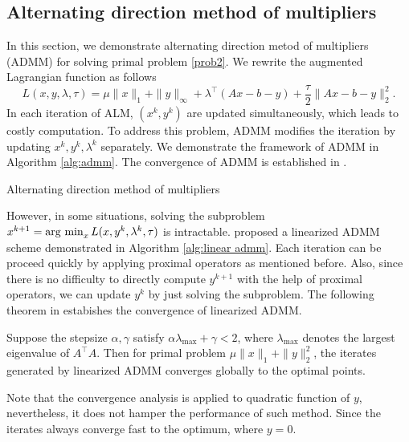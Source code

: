 \documentclass{article}
\begin{document}
\subsection{Alternating direction method of multipliers}
In this section, we demonstrate alternating direction metod of multipliers (ADMM) for solving primal problem \eqref{prob2}. We rewrite the augmented Lagrangian function as follows
\begin{equation}\label{eq:al}
	L(x,y,\lambda,\tau)=\mu\|x\|_1+\|y\|_\infty+\lambda^\top(Ax-b-y)+\frac{\tau}{2}\|Ax-b-y\|_2^2.
\end{equation}
In each iteration of ALM, $(x^k,y^k)$ are updated simultaneously, which leads to costly computation. To address this problem, ADMM modifies the iteration by updating $x^k,y^k,\lambda^k$ separately. We demonstrate the framework of ADMM in Algorithm \ref{alg:admm}. The convergence of ADMM is established in \cite{glowinski1989augmented}.
\begin{algorithm}[H]
\caption{Alternating direction method of multipliers}
\begin{algorithmic}[1]\label{alg:admm}
\ENDWHILE
{}
\end{algorithmic}
\end{algorithm}
However, in some situations, solving the subproblem $x^{k+1}=\operatorname{arg~min}_xL(x,y^k,\lambda^k,\tau)$ is intractable. \cite{yang2011alternating} proposed a linearized ADMM scheme demonstrated in Algorithm \ref{alg:linear admm}. Each iteration can be proceed quickly by applying proximal operators as mentioned before. Also, since there is no difficulty to directly compute $y^{k+1}$ with the help of proximal operators, we can update $y^k$ by just solving the subproblem. The following theorem in \cite{yang2011alternating} estabishes the convergence of linearized ADMM.
\begin{theorem}
Suppose the stepsize $\alpha,\gamma$ satisfy $\alpha\lambda_{\max}+\gamma<2$, where $\lambda_{\max}$ denotes the largest eigenvalue of $A^\top A$. Then for primal problem $\mu\|x\|_1+\|y\|_2^2$, the iterates generated by linearized ADMM converges globally to the optimal points.
\end{theorem}
Note that the convergence analysis is applied to quadratic function of $y$, nevertheless, it does not hamper the performance of such method. Since the iterates always converge fast to the optimum, where $y=0$.
\end{document}
